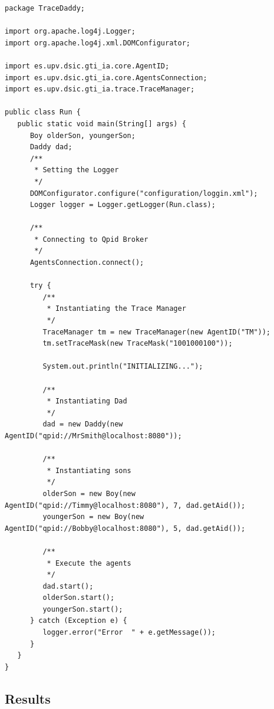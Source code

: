 		\begin{lstlisting}
package TraceDaddy;

import org.apache.log4j.Logger;
import org.apache.log4j.xml.DOMConfigurator;

import es.upv.dsic.gti_ia.core.AgentID;
import es.upv.dsic.gti_ia.core.AgentsConnection;
import es.upv.dsic.gti_ia.trace.TraceManager;

public class Run {
   public static void main(String[] args) {
      Boy olderSon, youngerSon;
      Daddy dad;
      /**
       * Setting the Logger
       */
      DOMConfigurator.configure("configuration/loggin.xml");
      Logger logger = Logger.getLogger(Run.class);

      /**
       * Connecting to Qpid Broker
       */
      AgentsConnection.connect();

      try {
         /**
          * Instantiating the Trace Manager
          */
         TraceManager tm = new TraceManager(new AgentID("TM"));
         tm.setTraceMask(new TraceMask("1001000100"));

         System.out.println("INITIALIZING...");

         /**
          * Instantiating Dad
          */
         dad = new Daddy(new AgentID("qpid://MrSmith@localhost:8080"));

         /**
          * Instantiating sons
          */
         olderSon = new Boy(new AgentID("qpid://Timmy@localhost:8080"), 7, dad.getAid());
         youngerSon = new Boy(new AgentID("qpid://Bobby@localhost:8080"), 5, dad.getAid());

         /**
          * Execute the agents
          */
         dad.start();
         olderSon.start();
         youngerSon.start();
      } catch (Exception e) {
         logger.error("Error  " + e.getMessage());
      }
   }
}
		\end{lstlisting}

	\subsection{Results}

